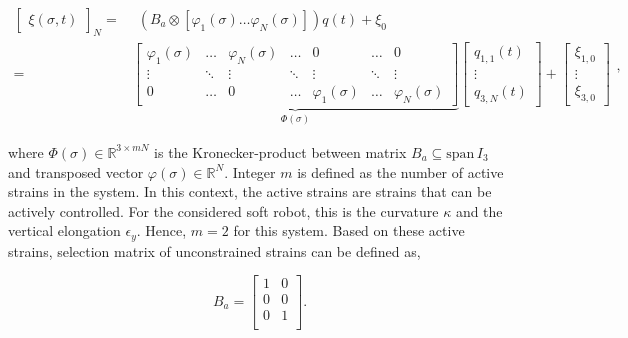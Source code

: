 \begin{equation}
\begin{aligned}
    \begin{bmatrix}\xi(\sigma,t)\end{bmatrix}_N = & \hspace{5pt}  (B_a \otimes [ \varphi_1(\sigma) \dots \varphi_N(\sigma) ])q(t) + \xi_0 \\ = &  \underbrace{ \begin{bmatrix}
    \varphi_1(\sigma) & \dots  & \varphi_N(\sigma) & \dots     & 0      & \dots  &  0 \\
    \vdots    & \ddots & \vdots    & \ddots    & \vdots & \ddots & \vdots \\
    0         & \dots  & 0         & \dots     & \varphi_1(\sigma) & \dots & \varphi_N (\sigma)
    \end{bmatrix}}_{\Phi(\sigma)} \begin{bmatrix} q_{1,1}(t) \\ \vdots \\ q_{3,N}(t) \end{bmatrix} +  \begin{bmatrix} \xi_{1,0} \\ \vdots \\ \xi_{3,0}   \end{bmatrix}
    \end{aligned},
\label{eq2:xishape}
\end{equation}

where $\Phi(\sigma) \in \mathbb{R}^{3 \times mN}$ is the Kronecker-product between matrix $B_a \subseteq \text{span} \hspace{2pt} I_3$ and transposed vector $\varphi(\sigma) \in \mathbb{R}^N$. Integer $m$ is defined as the number of active strains in the system. In this context, the active strains are strains that can be actively controlled. For the considered soft robot, this is the curvature $\kappa$ and the vertical elongation $\epsilon_y$. Hence, $m=2$ for this system. Based on these active strains, selection matrix of unconstrained strains can be defined as,

\begin{equation}
    B_a = \begin{bmatrix}
    1 & 0 \\
    0 & 0  \\
    0 & 1  \\
    \end{bmatrix}.
    \label{eq2:Ba}
\end{equation}

